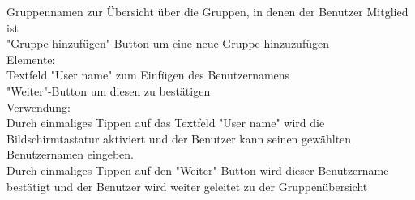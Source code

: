 Gruppennamen zur Übersicht über die Gruppen, in denen der Benutzer Mitglied ist\\
"Gruppe hinzufügen"-Button um eine neue Gruppe hinzuzufügen\\
[Kleinüberschrift]Elemente:\\
Textfeld "User name" zum Einfügen des Benutzernamens\\
"Weiter"-Button um diesen zu bestätigen\\
[Kleinüberschrift]Verwendung:\\
Durch einmaliges Tippen auf das Textfeld "User name" wird die Bildschirmtastatur aktiviert und der Benutzer kann seinen gewählten Benutzernamen eingeben.\\
Durch einmaliges Tippen auf den "Weiter"-Button wird dieser Benutzername bestätigt und der Benutzer wird weiter geleitet zu der Gruppenübersicht\\ \\

